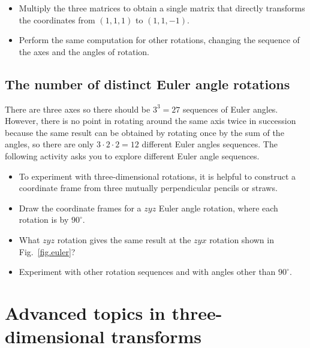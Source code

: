 \begin{framed}
\begin{itemize}
\item Multiply the three matrices to obtain a single matrix that directly transforms the coordinates from $(1,1,1)$ to $(1,1,-1)$.
\item Perform the same computation for other rotations, changing the sequence of the axes and the angles of rotation.
\end{itemize}
\end{framed}

\subsection{The number of distinct Euler angle rotations}

There are three axes so there should be $3^3=27$ sequences of Euler angles. However, there is no point in rotating around the same axis twice in succession because the same result can be obtained by rotating once by the sum of the angles, so there are only $3\cdot 2\cdot 2=12$ different Euler angles sequences.  The following activity asks you to explore different Euler angle sequences.

\begin{framed}
\begin{itemize}
\item To experiment with three-dimensional rotations, it is helpful to construct a coordinate frame from three mutually perpendicular pencils or straws.
\item Draw the coordinate frames for a $zyz$ Euler angle rotation, where each rotation is by $90^\circ$. %
\item What $zyz$ rotation gives the same result at the $zyx$ rotation shown in Fig.~\ref{fig.euler}? %
\item Experiment with other rotation sequences and with angles other than $90^\circ$.
\end{itemize}
\end{framed}

\section{Advanced topics in three-dimensional transforms}\label{s.advanced-three}

